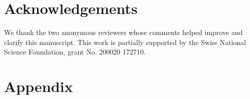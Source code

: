 \documentclass[10pt]{article}
\begin{document}
\section*{Acknowledgements} We thank the two anonymous reviewers whose comments helped improve and clarify this manuscript. This work is partially supported by the Swiss National Science Foundation, grant No. 200020 172710.

\section*{Appendix}

\end{document}
